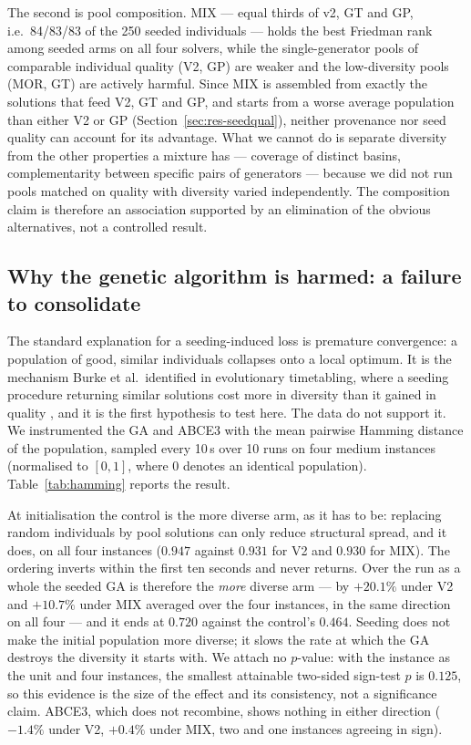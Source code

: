 \documentclass[review]{elsarticle}
\begin{document}
The second is pool composition. MIX --- equal thirds of v2, GT and GP,
i.e.\ 84/83/83 of the 250 seeded individuals --- holds the best Friedman
rank among seeded arms on all four solvers, while the single-generator
pools of comparable individual quality (V2, GP) are weaker and the
low-diversity pools (MOR, GT) are actively harmful. Since MIX is assembled
from exactly the solutions that feed V2, GT and GP, and starts from a worse
average population than either V2 or GP
(Section~\ref{sec:res-seedqual}), neither provenance nor seed quality can
account for its advantage. What we cannot do is separate diversity from
the other properties a mixture has --- coverage of distinct basins,
complementarity between specific pairs of generators --- because we did not
run pools matched on quality with diversity varied independently. The
composition claim is therefore an association supported by an elimination
of the obvious alternatives, not a controlled result.

\subsection{Why the genetic algorithm is harmed: a failure to
consolidate}\label{sec:whyga}

The standard explanation for a seeding-induced loss is premature
convergence: a population of good, similar individuals collapses onto a
local optimum. It is the mechanism Burke et al.\ identified in evolutionary
timetabling, where a seeding procedure returning similar solutions cost
more in diversity than it gained in quality \cite{Burke1998}, and it is the
first hypothesis to test here. The data do not support it. We instrumented the GA and
ABCE3 with the mean pairwise Hamming distance of the population, sampled
every 10\,s over 10 runs on four medium instances (normalised to $[0,1]$,
where 0 denotes an identical population). Table~\ref{tab:hamming} reports
the result.

At initialisation the control is the more diverse arm, as it has to be:
replacing random individuals by pool solutions can only reduce structural
spread, and it does, on all four instances ($0.947$ against $0.931$ for V2
and $0.930$ for MIX). The ordering inverts within the first ten seconds and never
returns. Over the run as a whole the seeded GA is therefore the \emph{more}
diverse arm --- by $+20.1\%$ under V2 and $+10.7\%$ under MIX averaged over
the four instances, in the same direction on all four --- and it ends at
$0.720$ against the control's $0.464$. Seeding does not make the initial
population more diverse; it slows the rate at which the GA destroys the
diversity it starts with. We attach no
$p$-value: with the instance as the unit and four instances, the smallest
attainable two-sided sign-test $p$ is $0.125$, so this evidence is the size
of the effect and its consistency, not a significance claim. ABCE3, which
does not recombine, shows nothing in either direction ($-1.4\%$ under V2,
$+0.4\%$ under MIX, two and one instances agreeing in sign).
\end{document}
